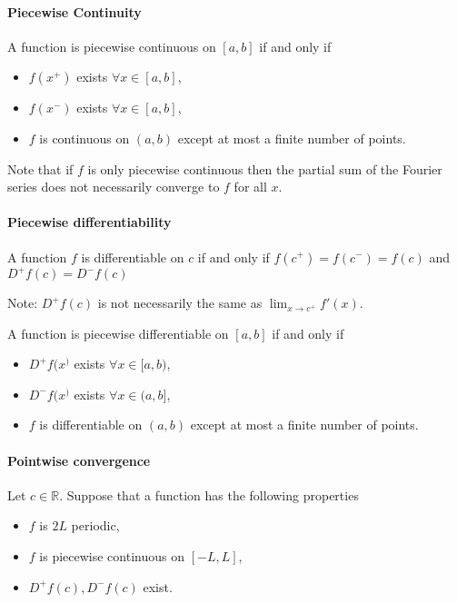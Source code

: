 \documentclass[12pt, letterpaper]{article}
\begin{document}
    \paragraph{Piecewise Continuity}
    A function is piecewise continuous on \([a, b]\) if and only if 
    \begin{itemize}
        \item \(f(x^+)\) exists \(\forall x\in [a, b]\),
        \item \(f(x^-)\) exists \(\forall x\in [a, b]\),
        \item \(f\) is continuous on \((a, b)\) except at most a finite number of points.
    \end{itemize}
    Note that if \(f\) is only piecewise continuous then the partial sum of the Fourier series does not necessarily converge to \(f\) for all \(x\).

    \paragraph{Piecewise differentiability}
    A function \(f\) is differentiable on \(c\) if and only if
    \(f(c^+) = f(c^-) = f(c)\) and \(D^+ f(c) = D^- f(c)\)
    
    Note: \(D^+ f(c)\) is not necessarily the same as \(\lim_{x\to c^+}f'(x)\).

    A function is piecewise differentiable on \([a, b]\) if and only if 
    \begin{itemize}
        \item \(D^+f(x^)\) exists \(\forall x\in [a, b)\),
        \item \(D^-f(x^)\) exists \(\forall x\in (a, b]\),
        \item \(f\) is differentiable on \((a, b)\) except at most a finite number of points.
    \end{itemize}

    \paragraph{Pointwise convergence}
    Let \(c\in \mathbb{R}\). Suppose that a function has the following properties

    \begin{itemize}
        \item \(f\) is \(2L\) periodic,
        \item \(f\) is piecewise continuous on \([-L, L]\),
        \item \(D^+f(c), D^-f(c)\) exist.
    \end{itemize}
    
\end{document}
